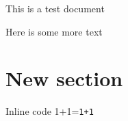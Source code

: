 \documentclass{article}
\begin{document}
This is a test document


Here is some more text

\section{New section}


Inline code 1+1=\texttt{1+1}
\end{document}
